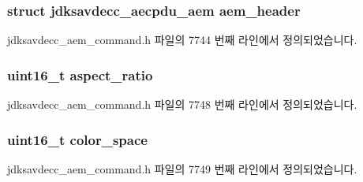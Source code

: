 \subsubsection[{\texorpdfstring{aem\+\_\+header}{aem_header}}]{\setlength{\rightskip}{0pt plus 5cm}struct {\bf jdksavdecc\+\_\+aecpdu\+\_\+aem} aem\+\_\+header}\hypertarget{structjdksavdecc__aem__command__set__video__format_ae1e77ccb75ff5021ad923221eab38294}{}\label{structjdksavdecc__aem__command__set__video__format_ae1e77ccb75ff5021ad923221eab38294}


jdksavdecc\+\_\+aem\+\_\+command.\+h 파일의 7744 번째 라인에서 정의되었습니다.

\subsubsection[{\texorpdfstring{aspect\+\_\+ratio}{aspect_ratio}}]{\setlength{\rightskip}{0pt plus 5cm}uint16\+\_\+t aspect\+\_\+ratio}\hypertarget{structjdksavdecc__aem__command__set__video__format_aa2976b5991e88ce43c451d2683d5f329}{}\label{structjdksavdecc__aem__command__set__video__format_aa2976b5991e88ce43c451d2683d5f329}


jdksavdecc\+\_\+aem\+\_\+command.\+h 파일의 7748 번째 라인에서 정의되었습니다.

\subsubsection[{\texorpdfstring{color\+\_\+space}{color_space}}]{\setlength{\rightskip}{0pt plus 5cm}uint16\+\_\+t color\+\_\+space}\hypertarget{structjdksavdecc__aem__command__set__video__format_a5f1234a863bb834ff7c110509884d228}{}\label{structjdksavdecc__aem__command__set__video__format_a5f1234a863bb834ff7c110509884d228}


jdksavdecc\+\_\+aem\+\_\+command.\+h 파일의 7749 번째 라인에서 정의되었습니다.

